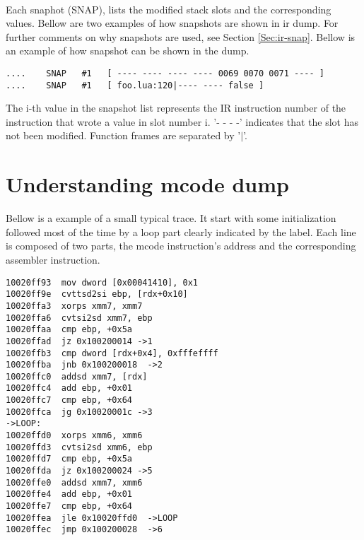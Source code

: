 \\
Each snaphot (SNAP), lists the modified stack slots and the corresponding values.
Bellow are two examples of how snapshots are shown in ir dump. For further
comments on why snapshots are used, see Section \ref{Sec:ir-snap}. Bellow is an
example of how snapshot can be shown in the dump.
\begin{verbatim}
....    SNAP   #1   [ ---- ---- ---- ---- 0069 0070 0071 ---- ]
....    SNAP   #1   [ foo.lua:120|---- ---- false ]
\end{verbatim}
The i-th value in the snapshot list represents the IR instruction number of the
instruction that wrote a value in slot number i. '- - - -' indicates that the slot
has not been modified. Function frames are separated by '$\vert$'.


\section{Understanding mcode dump}
\label{Sec:dump-mcode}

Bellow is a example of a small typical trace. It start with some initialization
followed most of the time by a loop part clearly indicated by the label.
Each line is composed of two parts, the mcode instruction's address and the
corresponding assembler instruction.
\begin{verbatim}
10020ff93  mov dword [0x00041410], 0x1
10020ff9e  cvttsd2si ebp, [rdx+0x10]
10020ffa3  xorps xmm7, xmm7
10020ffa6  cvtsi2sd xmm7, ebp
10020ffaa  cmp ebp, +0x5a
10020ffad  jz 0x100200014 ->1
10020ffb3  cmp dword [rdx+0x4], 0xfffeffff
10020ffba  jnb 0x100200018  ->2
10020ffc0  addsd xmm7, [rdx]
10020ffc4  add ebp, +0x01
10020ffc7  cmp ebp, +0x64
10020ffca  jg 0x10020001c ->3
->LOOP:
10020ffd0  xorps xmm6, xmm6
10020ffd3  cvtsi2sd xmm6, ebp
10020ffd7  cmp ebp, +0x5a
10020ffda  jz 0x100200024 ->5
10020ffe0  addsd xmm7, xmm6
10020ffe4  add ebp, +0x01
10020ffe7  cmp ebp, +0x64
10020ffea  jle 0x10020ffd0  ->LOOP
10020ffec  jmp 0x100200028  ->6
\end{verbatim}


